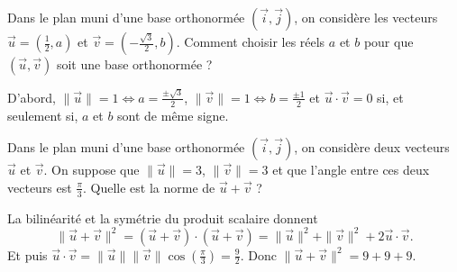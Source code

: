 \begin{question}
Dans le plan muni d'une base orthonormée $(\vec{i},\vec{j})$, on considère les vecteurs $\displaystyle \vec{u}=\left(\frac{1}{2},a\right)$ et $\displaystyle \vec{v}=\left(-\frac{\sqrt{3}}{2},b\right)$. Comment choisir les réels $a$ et $b$ pour que $(\vec{u},\vec{v})$ soit une base orthonormée ?
\begin{answers}  
\end{answers}
\begin{explanations}
D'abord, $\displaystyle \|\vec{u}\|=1\Leftrightarrow a=\frac{\pm \sqrt{3}}{2}$, $\displaystyle \|\vec{v}\|=1\Leftrightarrow b=\frac{\pm 1}{2}$ et $\vec{u}\cdot\vec{v}=0$ si, et seulement si, $a$ et $b$ sont de même signe.
\end{explanations}
\end{question}


\begin{question}
Dans le plan muni d'une base orthonormée $(\vec{i},\vec{j})$, on considère deux vecteurs $\displaystyle \vec{u}$ et $\displaystyle \vec{v}$. On suppose que $\|\vec{u}\|=3$, $\|\vec{v}\|=3$ et que l'angle entre ces deux vecteurs est $\displaystyle \frac{\pi}{3}$. Quelle est la norme de $\vec{u}+\vec{v}$ ?
\begin{answers}  
\end{answers}
\begin{explanations}
La bilinéarité et la symétrie du produit scalaire donnent
$$\|\vec{u}+\vec{v}\|^2=(\vec{u}+\vec{v})\cdot(\vec{u}+\vec{v})=\|\vec{u}\|^2+\|\vec{v}\|^2+2\vec{u}\cdot\vec{v}.$$
Et puis $\displaystyle \vec{u}\cdot \vec{v}=\|\vec{u}\|\|\vec{v}\|\cos \left(\frac{\pi}{3}\right)=\frac{9}{2}$. Donc $\|\vec{u}+\vec{v}\|^2=9+9+9$.
\end{explanations}
\end{question}


